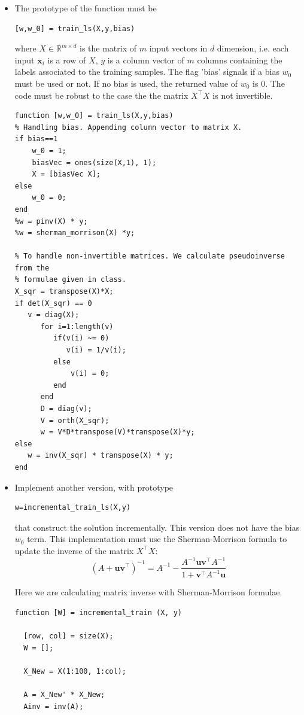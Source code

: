 \documentclass{article}
\newcommand{\field}[1]{\mathbb{#1}}
\newcommand{\R}{\field{R}}
\newcommand{\bx}{\boldsymbol{x}}
\newcommand{\bu}{\boldsymbol{u}}
\newcommand{\bv}{\boldsymbol{v}}
\begin{document}
\begin{itemize}
\item The prototype of the function must be 
\begin{verbatim}
[w,w_0] = train_ls(X,y,bias)
\end{verbatim}
where $X \in \R^{m \times d}$ is the matrix of $m$ input vectors in $d$ dimension, i.e. each input $\bx_i$ is a row of $X$, $y$ is a column vector of $m$ columns containing the labels associated to the training samples. The flag 'bias' signals if a bias $w_0$ must be used or not. If no bias is used, the returned value of $w_0$ is 0. The code must be robust to the case the the matrix $X^\top X$ is not invertible.

\begin{verbatim}
function [w,w_0] = train_ls(X,y,bias)
% Handling bias. Appending column vector to matrix X.
if bias==1
    w_0 = 1;
    biasVec = ones(size(X,1), 1);
    X = [biasVec X];
else
    w_0 = 0;
end
%w = pinv(X) * y;
%w = sherman_morrison(X) *y;

% To handle non-invertible matrices. We calculate pseudoinverse from the
% formulae given in class.
X_sqr = transpose(X)*X;
if det(X_sqr) == 0
   v = diag(X);
      for i=1:length(v)
         if(v(i) ~= 0)
            v(i) = 1/v(i);
         else
             v(i) = 0;
         end
      end
      D = diag(v);
      V = orth(X_sqr);
      w = V*D*transpose(V)*transpose(X)*y;   
else
   w = inv(X_sqr) * transpose(X) * y;
end
\end{verbatim}

\item Implement another version, with prototype
\begin{verbatim}
w=incremental_train_ls(X,y)
\end{verbatim}
that construct the solution incrementally. This version does not have the bias $w_0$ term. This implementation must use the Sherman-Morrison formula to update the inverse of the matrix $X^\top X$:
\[
  (A + \bu\bv^\top)^{-1} = A^{-1} - \frac{A^{-1}\bu\bv^\top A^{-1}}{1 + \bv^\top A^{-1}\bu}
\]

Here we are calculating matrix inverse with Sherman-Morrison formulae.
\begin{verbatim}
function [W] = incremental_train (X, y)
 
  [row, col] = size(X);
  W = [];

  X_New = X(1:100, 1:col);
  
  A = X_New' * X_New;
  Ainv = inv(A);
  

\end{verbatim}
\end{itemize}
\end{document}
